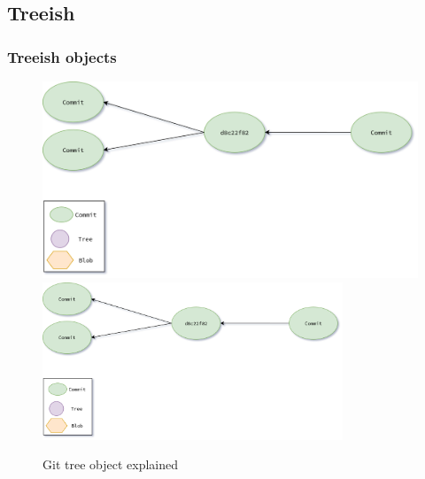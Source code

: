 \subsection{Treeish}
\begin{frame}
    \frametitle{Treeish objects}
    \begin{figure}
        \begin{center}
            {
                \includegraphics[height=0.70\textheight,keepaspectratio]{./images/Treeish.png}
            }
            {
                \includegraphics[height=0.6\textheight,width=0.8\textwidth]{./images/Treeish.png}
            }
            \caption{Git tree object explained}
        \end{center}
    \end{figure}
\end{frame}

